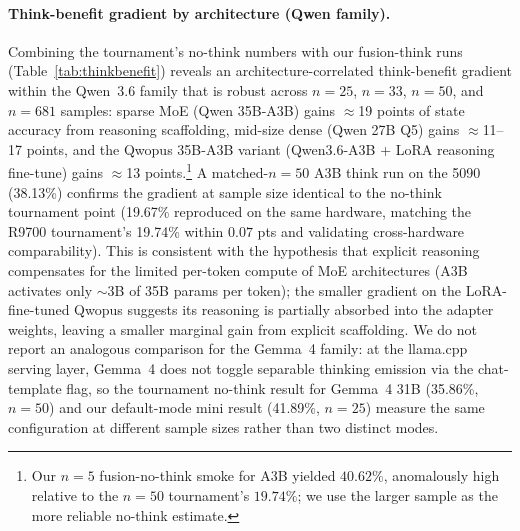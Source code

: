 \documentclass[11pt]{article}
\begin{document}
\paragraph{Think-benefit gradient by architecture (Qwen family).}
Combining the tournament's no-think numbers with our fusion-think runs (Table~\ref{tab:thinkbenefit}) reveals an architecture-correlated think-benefit gradient within the Qwen~3.6 family that is robust across $n{=}25$, $n{=}33$, $n{=}50$, and $n{=}681$ samples: sparse MoE (Qwen 35B-A3B) gains $\approx$19 points of state accuracy from reasoning scaffolding, mid-size dense (Qwen 27B Q5) gains $\approx$11--17 points, and the Qwopus 35B-A3B variant (Qwen3.6-A3B + LoRA reasoning fine-tune) gains $\approx$13 points.\footnote{Our $n{=}5$ fusion-no-think smoke for A3B yielded $40.62\%$, anomalously high relative to the $n{=}50$ tournament's $19.74\%$; we use the larger sample as the more reliable no-think estimate.} A matched-$n{=}50$ A3B think run on the 5090 (38.13\%) confirms the gradient at sample size identical to the no-think tournament point (19.67\% reproduced on the same hardware, matching the R9700 tournament's 19.74\% within $0.07$ pts and validating cross-hardware comparability). This is consistent with the hypothesis that explicit reasoning compensates for the limited per-token compute of MoE architectures (A3B activates only $\sim$3B of 35B params per token); the smaller gradient on the LoRA-fine-tuned Qwopus suggests its reasoning is partially absorbed into the adapter weights, leaving a smaller marginal gain from explicit scaffolding. We do not report an analogous comparison for the Gemma~4 family: at the llama.cpp serving layer, Gemma~4 does not toggle separable thinking emission via the chat-template flag, so the tournament no-think result for Gemma~4 31B (35.86\%, $n{=}50$) and our default-mode mini result (41.89\%, $n{=}25$) measure the same configuration at different sample sizes rather than two distinct modes.
\end{document}
